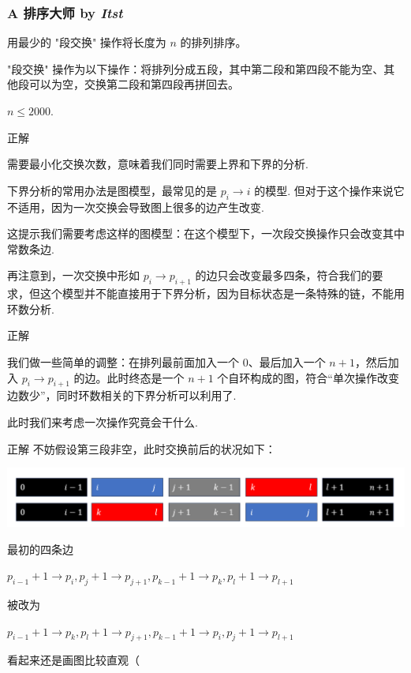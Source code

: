 \frame
{
  \frametitle{A 排序大师 {by \itshape Itst}}
	用最少的 "段交换" 操作将长度为 $n$ 的排列排序。
	
	"段交换" 操作为以下操作：将排列分成五段，其中第二段和第四段不能为空、其他段可以为空，交换第二段和第四段再拼回去。

	$n\le 2000$.
}

\begin{frame}{正解}

	需要最小化交换次数，意味着我们同时需要上界和下界的分析.

	下界分析的常用办法是图模型，最常见的是 $p_i\rightarrow i$ 的模型. 但对于这个操作来说它不适用，因为一次交换会导致图上很多的边产生改变. \pause

	这提示我们需要考虑这样的图模型：在这个模型下，一次段交换操作只会改变其中常数条边.

	再注意到，一次交换中形如 $p_i\rightarrow p_{i+1}$ 的边只会改变最多四条，符合我们的要求，但这个模型并不能直接用于下界分析，因为目标状态是一条特殊的链，不能用环数分析.

\end{frame}

\begin{frame}{正解}

	我们做一些简单的调整：在排列最前面加入一个 $0$、最后加入一个 $n+1$，然后加入 $p_i\rightarrow p_{i+1}$ 的边。此时终态是一个 ${n+1}$ 个自环构成的图，符合“单次操作改变边数少”，同时环数相关的下界分析可以利用了.

	此时我们来考虑一次操作究竟会干什么.

\end{frame}

\begin{frame}{正解}
	不妨假设第三段非空，此时交换前后的状况如下：

	\centering\includegraphics[width=\textwidth,keepaspectratio]{sources/A1.jpg}

	最初的四条边


$p_{i-1}+1\rightarrow p_i, p_j+1\rightarrow p_{j+1}, p_{k-1}+1\rightarrow p_k, p_l+1\rightarrow p_{l+1}$

 	被改为

$p_{i-1}+1\rightarrow p_k, p_l+1\rightarrow p_{j+1}, p_{k-1}+1\rightarrow p_i, p_j+1\rightarrow p_{l+1}$

	看起来还是画图比较直观（

\end{frame}


